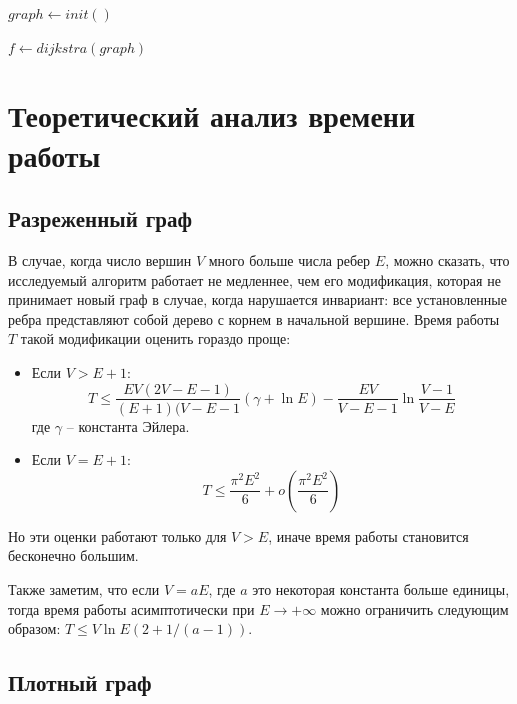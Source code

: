 \documentclass{spisok-article}
\begin{document}
\begin{algorithm}[H]
  
  $graph \gets init()$
  
  $f \gets dijkstra(graph)$
  
  \end{algorithm}


\section{Теоретический анализ времени работы}

\subsection{Разреженный граф}
В случае, когда число вершин $V$ много больше числа ребер $E$, можно сказать, что исследуемый алгоритм работает не медленнее, чем его модификация, которая не принимает новый граф в случае, когда нарушается инвариант: все установленные ребра представляют собой дерево с корнем в начальной вершине. Время работы $T$ такой модификации оценить гораздо проще:
\begin{itemize}
    \item Если $V > E + 1$:
    $$T \le \frac{EV(2V - E - 1)}{(E + 1)(V - E - 1}(\gamma + \ln E) - \frac{EV}{V - E - 1} \ln\frac{V - 1}{V - E}$$
    где $\gamma$ -- константа Эйлера.
    \item Если $V = E + 1$:
    $$T \le \frac{\pi^2 E^2}{6} + o\left( \frac{\pi^2 E^2}{6} \right)$$
\end{itemize}
Но эти оценки работают только для $V > E$, иначе время работы становится бесконечно большим.

Также заметим, что если $V = aE$, где $a$ это некоторая константа больше единицы, тогда время работы асимптотически при $E \to +\infty$ можно ограничить следующим образом: $T \le V \ln{E} \left(2 + 1/(a - 1)\right)$.

\subsection{Плотный граф}
\end{document}
